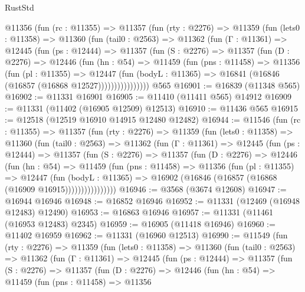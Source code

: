 \begin{lexlean}{RustStd}
\begin{coremodule}
    @11356
      (fun (rc : @11355) =>
      @11357
        (fun (rty : @2276) =>
        @11359
          (fun (lets0 : @11358) =>
          @11360
            (fun (tail0 : @2563) =>
            @11362
              (fun (Γ : @11361) =>
              @12445
                (fun (ps : @12444) =>
                @11357
                  (fun (S : @2276) =>
                  @11357
                    (fun (D : @2276) =>
                    @12446
                      (fun (hn : @54) =>
                      @11459
                        (fun (pns : @11458) =>
                        @11356
                          (fun (pl : @11355) =>
                          @12447
                            (fun (bodyL : @11365) =>
                            @16841 (@16846 (@16857 (@16868 @12527))))))))))))))))
    @565
@16901 := @16839 (@11348 @565)
@16902 := @11331 @16901
@16905 := @11410 (@11411 @565) @14912
@16909 := @11331 (@11402 (@16905 @12509) @12513)
@16910 := @11436 @565
@16915 := @12518 (@12519 @16910 @14915 @12480 @12482)
@16944 := @11546
    (fun (rc : @11355) =>
    @11357
      (fun (rty : @2276) =>
      @11359
        (fun (lets0 : @11358) =>
        @11360
          (fun (tail0 : @2563) =>
          @11362
            (fun (Γ : @11361) =>
            @12445
              (fun (ps : @12444) =>
              @11357
                (fun (S : @2276) =>
                @11357
                  (fun (D : @2276) =>
                  @12446
                    (fun (hn : @54) =>
                    @11459
                      (fun (pns : @11458) =>
                      @11356
                        (fun (pl : @11355) =>
                        @12447
                          (fun (bodyL : @11365) =>
                          @16902 (@16846 (@16857 (@16868 (@16909 @16915))))))))))))))))
@16946 := @3568 (@3674 @12608)
@16947 := @16944 @16946
@16948 := @16852 @16946
@16952 := @11331 (@12469 (@16948 @12483) @12490)
@16953 := @16863 @16946
@16957 := @11331 (@11461 (@16953 @12483) @2345)
@16959 := @16905 (@11418 @16946)
@16960 := @11402 @16959
@16962 := @11331 (@16960 @12513)
@16990 := @11549
    (fun (rty : @2276) =>
    @11359
      (fun (lets0 : @11358) =>
      @11360
        (fun (tail0 : @2563) =>
        @11362
          (fun (Γ : @11361) =>
          @12445
            (fun (ps : @12444) =>
            @11357
              (fun (S : @2276) =>
              @11357
                (fun (D : @2276) =>
                @12446
                  (fun (hn : @54) =>
                  @11459
                    (fun (pns : @11458) =>
                    @11356

\end{coremodule}
\end{lexlean}
